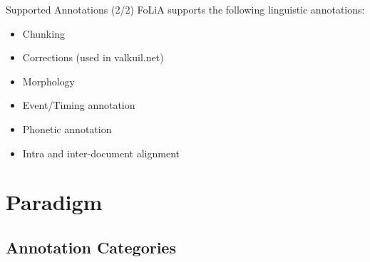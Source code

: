 \documentclass[compress,10pt]{beamer}
\begin{document}
\begin{frame}
    \begin{block}{Supported Annotations (2/2)}
        FoLiA supports the following linguistic annotations:
        \begin{itemize}                       
            \item Chunking
            \item Corrections (used in valkuil.net)
            \item Morphology
            \item Event/Timing annotation
            \item Phonetic annotation
            \item Intra and inter-document alignment                
        \end{itemize}   
    \end{block}
\end{frame}

        
       
\section{Paradigm}

\subsection{Annotation Categories}
\end{document}
